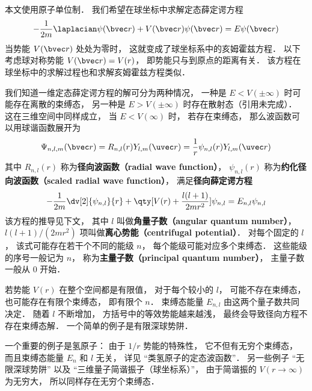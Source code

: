 

本文使用原子单位制． 我们希望在球坐标中求解定态薛定谔方程
\begin{equation}\label{RadSE_eq2}
-\frac{1}{2m}\laplacian \psi(\bvec r) + V(\bvec r)\psi(\bvec r) = E\psi(\bvec r)
\end{equation}
当势能 $V(\bvec r)$ 处处为零时， 这就变成了球坐标系中的亥姆霍兹方程． 以下考虑球对称势能 $V(\bvec r) = V(r)$， 即势能只与到原点的距离有关． 该方程在球坐标中的求解过程也和求解亥姆霍兹方程类似．

我们知道一维定态薛定谔方程的解可分为两种情况， 一种是 $E < V(\pm\infty)$ 时可能存在离散的束缚态， 另一种是 $E > V(\pm\infty)$ 时存在散射态（引用未完成）． 这在三维空间中同样成立， 当 $E < V(\infty)$ 时， 若存在束缚态， 那么波函数可以用球谐函数展开为
\begin{equation}\label{RadSE_eq4}
\Psi_{n, l,m}(\bvec r) = R_{n, l}(r) Y_{l,m}(\uvec r) = \frac{1}{r}\psi_{n, l}(r) Y_{l,m}(\uvec r)
\end{equation}
其中 $R_{n, l}(r)$ 称为\textbf{径向波函数（radial wave function）}， $\psi_{n, l}(r)$ 称为\textbf{约化径向波函数（scaled radial wave function）}， 满足\textbf{径向薛定谔方程}
\begin{equation}\label{RadSE_eq1}
-\frac{1}{2m} \dv[2]{\psi_{n, l}}{r} + \qty[V(r) + \frac{l(l + 1)}{2mr^2}]\psi_{n, l} = E_{n, l} \psi_{n, l}
\end{equation}
该方程的推导见下文， 其中 $l$ 叫做\textbf{角量子数（angular quantum number）}， $l(l + 1)/(2mr^2)$ 项叫做\textbf{离心势能（centrifugal potential）}． 对每个固定的 $l$， 该式可能存在若干个不同的能级 $n$， 每个能级可能对应多个束缚态． 这些能级的序号一般记为 $n$， 称为\textbf{主量子数（principal quantum number）}， 主量子数一般从 0 开始．

若势能 $V(r)$ 在整个空间都是有限值， 对于每个较小的 $l$， 可能不存在束缚态， 也可能存在有限个束缚态， 即有限个 $n$． 束缚态能量 $E_{n,l}$ 由这两个量子数共同决定． 随着 $l$ 不断增加， 方括号中的等效势能越来越浅， 最终会导致径向方程不存在束缚态解． 一个简单的例子是有限深球势阱．

一个重要的例子是氢原子： 由于 $1/r$ 势能的特殊性， 它不但有无穷个束缚态， 而且束缚态能量 $E_n$ 和 $l$ 无关， 详见 “类氢原子的定态波函数”． 另一些例子 “无限深球势阱” 以及 “三维量子简谐振子（球坐标系）”， 由于简谐振的 $V(r\to \infty)$ 为无穷大， 所以同样存在无穷个束缚态．

